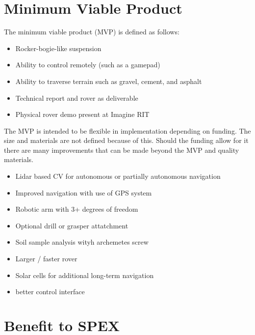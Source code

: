 \documentclass[conference]{IEEEtran} %
\begin{document}
\section{Minimum Viable Product}
\label{sec:mvp}
  The minimum viable product (MVP) is defined as follows:

\begin{itemize}
  \item Rocker-bogie-like suspension
  \item Ability to control remotely (such as a gamepad)
  \item Ability to traverse terrain such as gravel, cement, and asphalt
  \item Technical report and rover as deliverable
  \item Physical rover demo present at Imagine RIT
\end{itemize}

  The MVP is intended to be flexible in implementation depending on funding. The size and materials are not defined because of this. Should the funding allow for it there are many improvements that can be made beyond the MVP and quality materials. 

\begin{itemize}
  \item Lidar based CV for autonomous or partially autonomous navigation
  \item Improved navigation with use of GPS system
  \item Robotic arm with 3+ degrees of freedom
    \item Optional drill or grasper attatchment
  \item Soil sample analysis wityh archemetes screw
  \item Larger / faster rover
  \item Solar cells for additional long-term navigation
  \item better control interface  
\end{itemize}

\section{Benefit to SPEX}
\label{sec:benefit}
\end{document}
